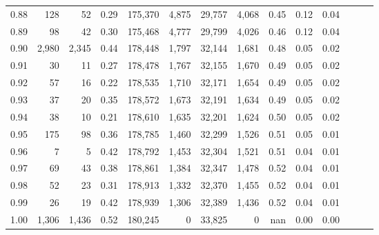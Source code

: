 \begin{tabular}{rrrrrrrrrrrrrr}
0.88 &     128 &     52 &  0.29 &  175,370 &    4,875 &  29,757 &   4,068 &  0.45 &  0.12 &      0.04 \\
0.89 &      98 &     42 &  0.30 &  175,468 &    4,777 &  29,799 &   4,026 &  0.46 &  0.12 &      0.04 \\
0.90 &   2,980 &  2,345 &  0.44 &  178,448 &    1,797 &  32,144 &   1,681 &  0.48 &  0.05 &      0.02 \\
0.91 &      30 &     11 &  0.27 &  178,478 &    1,767 &  32,155 &   1,670 &  0.49 &  0.05 &      0.02 \\
0.92 &      57 &     16 &  0.22 &  178,535 &    1,710 &  32,171 &   1,654 &  0.49 &  0.05 &      0.02 \\
0.93 &      37 &     20 &  0.35 &  178,572 &    1,673 &  32,191 &   1,634 &  0.49 &  0.05 &      0.02 \\
0.94 &      38 &     10 &  0.21 &  178,610 &    1,635 &  32,201 &   1,624 &  0.50 &  0.05 &      0.02 \\
0.95 &     175 &     98 &  0.36 &  178,785 &    1,460 &  32,299 &   1,526 &  0.51 &  0.05 &      0.01 \\
0.96 &       7 &      5 &  0.42 &  178,792 &    1,453 &  32,304 &   1,521 &  0.51 &  0.04 &      0.01 \\
0.97 &      69 &     43 &  0.38 &  178,861 &    1,384 &  32,347 &   1,478 &  0.52 &  0.04 &      0.01 \\
0.98 &      52 &     23 &  0.31 &  178,913 &    1,332 &  32,370 &   1,455 &  0.52 &  0.04 &      0.01 \\
0.99 &      26 &     19 &  0.42 &  178,939 &    1,306 &  32,389 &   1,436 &  0.52 &  0.04 &      0.01 \\
1.00 &   1,306 &  1,436 &  0.52 &  180,245 &        0 &  33,825 &       0 &   nan &  0.00 &      0.00 \\
\bottomrule
\end{tabular}
